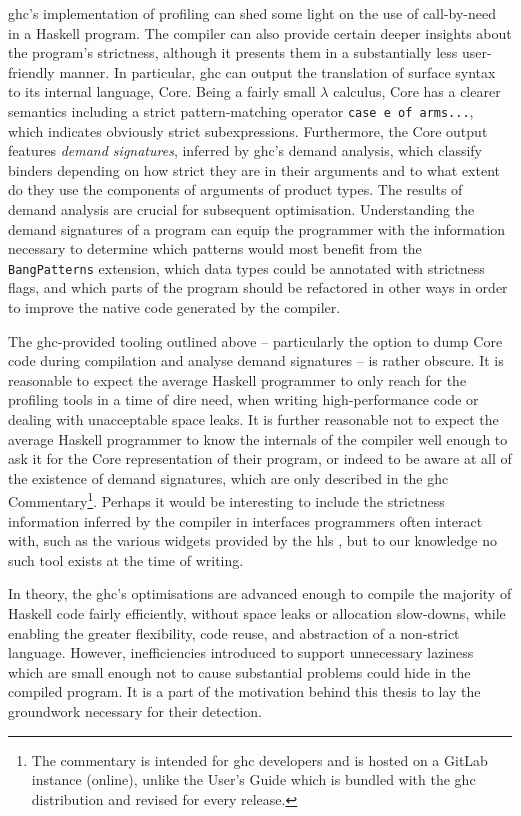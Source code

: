 \documentclass[thesis=B,english]{FITthesis}[2019/12/23]
\newcommand{\hsCode}[1]{\texttt{#1}}
\begin{document}
\acrshort{ghc}'s implementation of profiling can shed some light on the use of
call-by-need in a Haskell program. The compiler can also provide certain deeper
insights about the program's strictness, although it presents them in a
substantially less user-friendly manner. In particular, \acrshort{ghc} can
output the translation of surface syntax to its internal language, Core. Being
a fairly small $\lambda$ calculus, Core has a clearer semantics including a
strict pattern-matching operator \hsCode{case e of arms...}, which indicates
obviously strict subexpressions. Furthermore, the Core output features
\textit{demand signatures}, inferred by \acrshort{ghc}'s demand
analysis\cite{cmtary-demand-analysis}, which classify binders depending on how
strict they are in their arguments and to what extent do they use the
components of arguments of product types. The results of demand analysis are
crucial for subsequent optimisation. Understanding the demand signatures of a
program can equip the programmer with the information necessary to determine
which patterns would most benefit from the \texttt{BangPatterns} extension,
which data types could be annotated with strictness flags, and which parts of
the program should be refactored in other ways in order to improve the native
code generated by the compiler.

The \acrshort{ghc}-provided tooling outlined above -- particularly the option
to dump Core code during compilation and analyse demand signatures -- is rather
obscure. It is reasonable to expect the average Haskell programmer to only
reach for the profiling tools in a time of dire need, when writing
high-performance code or dealing with unacceptable space leaks. It is further
reasonable not to expect the average Haskell programmer to know the internals
of the compiler well enough to ask it for the Core representation of their
program, or indeed to be aware at all of the existence of demand signatures,
which are only described in the \acrshort{ghc} Commentary\footnote{
	The commentary is intended for \acrshort{ghc} developers and is hosted on a
	GitLab instance (online), unlike the User's Guide which is bundled with the
	\acrshort{ghc} distribution and revised for every release.
}. Perhaps it would be interesting to include the strictness information
inferred by the compiler in interfaces programmers often interact with, such as
the various widgets provided by the \acrfull{hls} \cite{gh-hls}, but
to our knowledge no such tool exists at the time of writing.

In theory, the \acrlong{ghc}'s optimisations are advanced enough to compile the
majority of Haskell code fairly efficiently, without space leaks or allocation
slow-downs, while enabling the greater flexibility, code reuse, and abstraction
of a non-strict language. However, inefficiencies introduced to support
unnecessary laziness which are small enough not to cause substantial problems
could hide in the compiled program. It is a part of the motivation behind this
thesis to lay the groundwork necessary for their detection.
\end{document}
